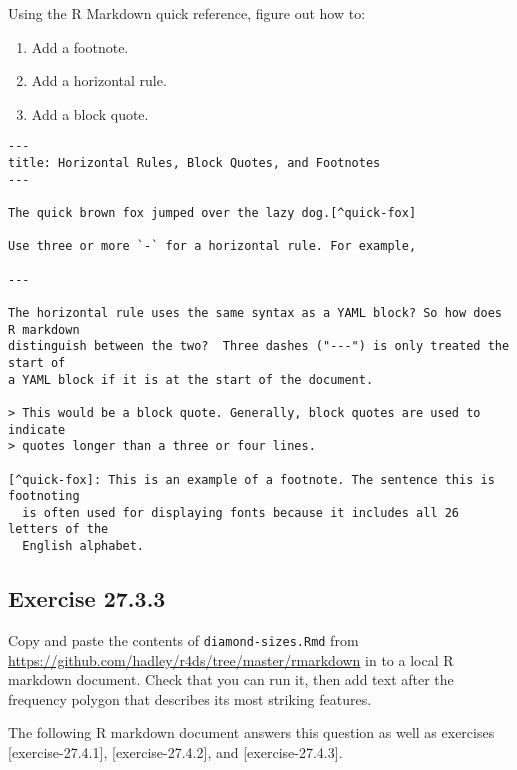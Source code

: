 \documentclass[]{book}
\providecommand{\tightlist}{%
  \setlength{\itemsep}{0pt}\setlength{\parskip}{0pt}}
\theoremstyle{plain}
\theoremstyle{remark}
\theoremstyle{definition}
\theoremstyle{definition}
\theoremstyle{definition}
\theoremstyle{remark}
\begin{document}
Using the R Markdown quick reference, figure out how to:

\begin{enumerate}
\def\labelenumi{\arabic{enumi}.}
\tightlist
\item
  Add a footnote.
\item
  Add a horizontal rule.
\item
  Add a block quote.
\end{enumerate}

\begin{verbatim}
---
title: Horizontal Rules, Block Quotes, and Footnotes
---

The quick brown fox jumped over the lazy dog.[^quick-fox]

Use three or more `-` for a horizontal rule. For example,

---

The horizontal rule uses the same syntax as a YAML block? So how does R markdown
distinguish between the two?  Three dashes ("---") is only treated the start of
a YAML block if it is at the start of the document.

> This would be a block quote. Generally, block quotes are used to indicate
> quotes longer than a three or four lines.

[^quick-fox]: This is an example of a footnote. The sentence this is footnoting
  is often used for displaying fonts because it includes all 26 letters of the
  English alphabet.
\end{verbatim}

\hypertarget{exercise-27.3.3}{%
\subsection*{\texorpdfstring{Exercise
{27.3.3}}{Exercise 27.3.3}}\label{exercise-27.3.3}}

Copy and paste the contents of \texttt{diamond-sizes.Rmd} from
\url{https://github.com/hadley/r4ds/tree/master/rmarkdown} in to a local
R markdown document. Check that you can run it, then add text after the
frequency polygon that describes its most striking features.

The following R markdown document answers this question as well as
exercises {[}exercise-27.4.1{]}, {[}exercise-27.4.2{]}, and
{[}exercise-27.4.3{]}.
\end{document}
